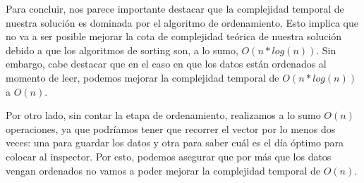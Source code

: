 Para concluir, nos parece importante destacar que la complejidad temporal de nuestra solución es dominada por el algoritmo de ordenamiento. Esto implica que no va a ser posible mejorar la cota de complejidad teórica de nuestra solución debido a que los algoritmos de sorting son, a lo sumo, $O(n*log(n))$. Sin embargo, cabe destacar que en el caso en que los datos están ordenados al momento de leer, podemos mejorar la complejidad temporal de $O(n * log (n))$ a $O(n)$.

Por otro lado, sin contar la etapa de ordenamiento, realizamos a lo sumo $O(n)$ operaciones, ya que podríamos tener que recorrer el vector por lo menos dos veces: una para guardar los datos y otra para saber cuál es el día óptimo para colocar al inspector. Por esto, podemos asegurar que por más que los datos vengan ordenados no vamos a poder mejorar la complejidad temporal de $O(n)$.